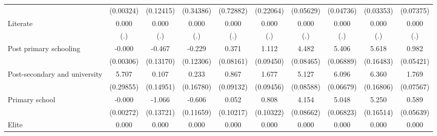 {\begin{tabular}{l*{9}{c}}
                    &   (0.00324)         &   (0.12415)         &   (0.34386)         &   (0.72882)         &   (0.22064)         &   (0.05629)         &   (0.04736)         &   (0.03353)         &   (0.07375)         \\
Literate            &       0.000         &       0.000         &       0.000         &       0.000         &       0.000         &       0.000         &       0.000         &       0.000         &       0.000         \\
                    &         (.)         &         (.)         &         (.)         &         (.)         &         (.)         &         (.)         &         (.)         &         (.)         &         (.)         \\
Post primary schooling&      -0.000         &      -0.467\sym{***}&      -0.229         &       0.371\sym{***}&       1.112\sym{***}&       4.482\sym{***}&       5.406\sym{***}&       5.618\sym{***}&       0.982\sym{***}\\
                    &   (0.00306)         &   (0.13170)         &   (0.12306)         &   (0.08161)         &   (0.09450)         &   (0.08465)         &   (0.06889)         &   (0.16483)         &   (0.05421)         \\
Post-secondary and university&       5.707\sym{***}&       0.107         &       0.233         &       0.867\sym{***}&       1.677\sym{***}&       5.127\sym{***}&       6.096\sym{***}&       6.360\sym{***}&       1.769\sym{***}\\
                    &   (0.29855)         &   (0.14951)         &   (0.16780)         &   (0.09132)         &   (0.09456)         &   (0.08588)         &   (0.06679)         &   (0.16806)         &   (0.07567)         \\
Primary school      &      -0.000         &      -1.066\sym{***}&      -0.606\sym{***}&       0.052         &       0.808\sym{***}&       4.154\sym{***}&       5.048\sym{***}&       5.250\sym{***}&       0.589\sym{***}\\
                    &   (0.00272)         &   (0.13721)         &   (0.11659)         &   (0.10217)         &   (0.10322)         &   (0.08662)         &   (0.06823)         &   (0.16514)         &   (0.05639)         \\
Elite               &       0.000         &       0.000         &       0.000         &       0.000         &       0.000         &       0.000         &       0.000         &       0.000         &       0.000         \\

\end{tabular}}
